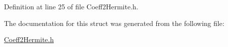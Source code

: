 Definition at line 25 of file Coeff2\+Hermite.\+h.



The documentation for this struct was generated from the following file\+:\begin{DoxyCompactItemize}
\item 
\hyperlink{_coeff2_hermite_8h}{Coeff2\+Hermite.\+h}\end{DoxyCompactItemize}
